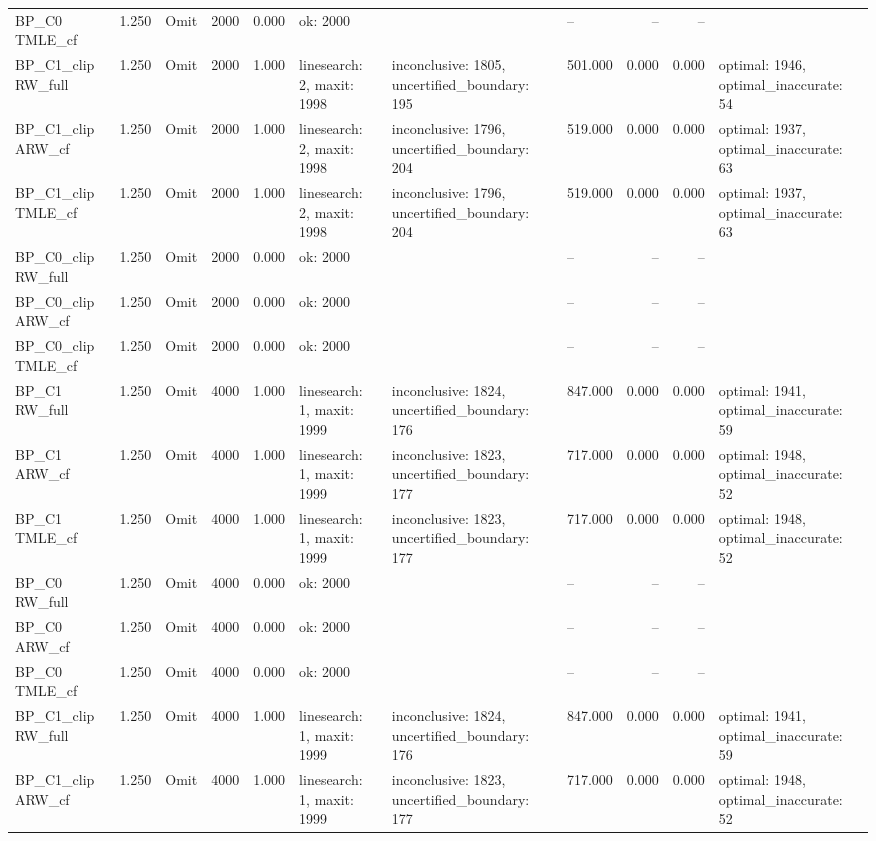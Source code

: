 \begin{tabular}{llllrlllrrl}
BP\_C0 TMLE\_cf & 1.250 & Omit & 2000 & 0.000 & ok: 2000 &  & -- & -- & -- &  \\
BP\_C1\_clip RW\_full & 1.250 & Omit & 2000 & 1.000 & linesearch: 2, maxit: 1998 & inconclusive: 1805, uncertified\_boundary: 195 & 501.000 & 0.000 & 0.000 & optimal: 1946, optimal\_inaccurate: 54 \\
BP\_C1\_clip ARW\_cf & 1.250 & Omit & 2000 & 1.000 & linesearch: 2, maxit: 1998 & inconclusive: 1796, uncertified\_boundary: 204 & 519.000 & 0.000 & 0.000 & optimal: 1937, optimal\_inaccurate: 63 \\
BP\_C1\_clip TMLE\_cf & 1.250 & Omit & 2000 & 1.000 & linesearch: 2, maxit: 1998 & inconclusive: 1796, uncertified\_boundary: 204 & 519.000 & 0.000 & 0.000 & optimal: 1937, optimal\_inaccurate: 63 \\
BP\_C0\_clip RW\_full & 1.250 & Omit & 2000 & 0.000 & ok: 2000 &  & -- & -- & -- &  \\
BP\_C0\_clip ARW\_cf & 1.250 & Omit & 2000 & 0.000 & ok: 2000 &  & -- & -- & -- &  \\
BP\_C0\_clip TMLE\_cf & 1.250 & Omit & 2000 & 0.000 & ok: 2000 &  & -- & -- & -- &  \\
BP\_C1 RW\_full & 1.250 & Omit & 4000 & 1.000 & linesearch: 1, maxit: 1999 & inconclusive: 1824, uncertified\_boundary: 176 & 847.000 & 0.000 & 0.000 & optimal: 1941, optimal\_inaccurate: 59 \\
BP\_C1 ARW\_cf & 1.250 & Omit & 4000 & 1.000 & linesearch: 1, maxit: 1999 & inconclusive: 1823, uncertified\_boundary: 177 & 717.000 & 0.000 & 0.000 & optimal: 1948, optimal\_inaccurate: 52 \\
BP\_C1 TMLE\_cf & 1.250 & Omit & 4000 & 1.000 & linesearch: 1, maxit: 1999 & inconclusive: 1823, uncertified\_boundary: 177 & 717.000 & 0.000 & 0.000 & optimal: 1948, optimal\_inaccurate: 52 \\
BP\_C0 RW\_full & 1.250 & Omit & 4000 & 0.000 & ok: 2000 &  & -- & -- & -- &  \\
BP\_C0 ARW\_cf & 1.250 & Omit & 4000 & 0.000 & ok: 2000 &  & -- & -- & -- &  \\
BP\_C0 TMLE\_cf & 1.250 & Omit & 4000 & 0.000 & ok: 2000 &  & -- & -- & -- &  \\
BP\_C1\_clip RW\_full & 1.250 & Omit & 4000 & 1.000 & linesearch: 1, maxit: 1999 & inconclusive: 1824, uncertified\_boundary: 176 & 847.000 & 0.000 & 0.000 & optimal: 1941, optimal\_inaccurate: 59 \\
BP\_C1\_clip ARW\_cf & 1.250 & Omit & 4000 & 1.000 & linesearch: 1, maxit: 1999 & inconclusive: 1823, uncertified\_boundary: 177 & 717.000 & 0.000 & 0.000 & optimal: 1948, optimal\_inaccurate: 52 \\

\end{tabular}
